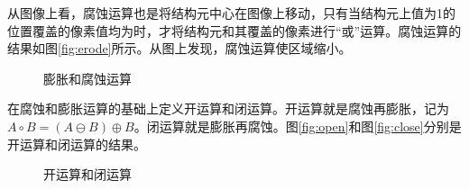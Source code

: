 从图像上看，腐蚀运算也是将结构元中心在图像上移动，只有当结构元上值为1的位置覆盖的像素值均为时，才将结构元和其覆盖的像素进行“或”运算。腐蚀运算的结果如图\ref{fig:erode}所示。从图上发现，腐蚀运算使区域缩小。
\begin{figure}
  \centering
  \hspace{1cm}
  \caption{膨胀和腐蚀运算}
\end{figure}

在腐蚀和膨胀运算的基础上定义开运算和闭运算。开运算就是腐蚀再膨胀，记为$A\circ B=(A\ominus B)\oplus B$。闭运算就是膨胀再腐蚀。图\ref{fig:open}和图\ref{fig:close}分别是开运算和闭运算的结果。
\begin{figure}
  \centering
  \hspace{1cm}
  \caption{开运算和闭运算}
\end{figure}


